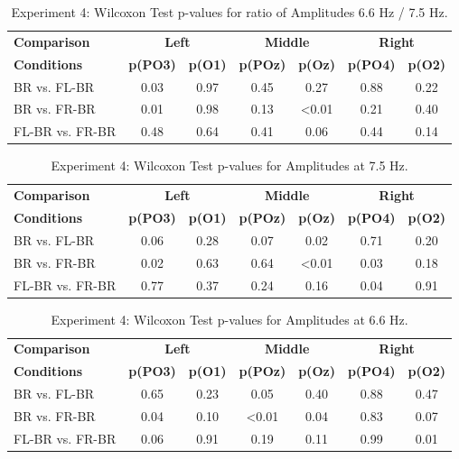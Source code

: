 \begin{table}[b]
\centering
\begin{tabularx}{\linewidth}{l *{6}{c}}
    \toprule
    \textbf{Comparison} & \multicolumn{2}{c}{\textbf{Left}} & \multicolumn{2}{c}{\textbf{Middle}} & \multicolumn{2}{c}{\textbf{Right}} \\
     \textbf{Conditions}& \textbf{p(PO3)} & \textbf{p(O1)} & \textbf{p(POz)} & \textbf{p(Oz)} & \textbf{p(PO4)} & \textbf{p(O2)} \\
    \midrule
    BR vs. FL-BR & 0.03 & 0.97 & 0.45 & 0.27 & 0.88 & 0.22 \\
    BR vs. FR-BR & 0.01 & 0.98 & 0.13 & <0.01 & 0.21 & 0.40 \\
    FL-BR vs. FR-BR & 0.48 & 0.64 & 0.41 & 0.06 & 0.44 & 0.14 \\
    \bottomrule
\end{tabularx}
\caption{Experiment 4: Wilcoxon Test p-values for ratio of Amplitudes 6.6 Hz / 7.5 Hz.}
\label{tab:ex4-p66/75}
\end{table}


\begin{table}[t]
\centering
\begin{tabularx}{\linewidth}{l *{6}{c}}
    \toprule
    \textbf{Comparison} & \multicolumn{2}{c}{\textbf{Left}} & \multicolumn{2}{c}{\textbf{Middle}} & \multicolumn{2}{c}{\textbf{Right}} \\
    \textbf{Conditions} & \textbf{p(PO3)} & \textbf{p(O1)} & \textbf{p(POz)} & \textbf{p(Oz)} & \textbf{p(PO4)} & \textbf{p(O2)} \\
    \midrule
    BR vs. FL-BR & 0.06 & 0.28 & 0.07 & 0.02 & 0.71 & 0.20 \\
    BR vs. FR-BR & 0.02 & 0.63 & 0.64 & <0.01 & 0.03 & 0.18 \\
    FL-BR vs. FR-BR & 0.77 & 0.37 & 0.24 & 0.16 & 0.04 & 0.91 \\
    \bottomrule
\end{tabularx}
\caption{Experiment 4: Wilcoxon Test p-values for Amplitudes at 7.5 Hz.}
\label{tab:ex4-p75}
\end{table}


\begin{table}[t]
\centering
\begin{tabularx}{\linewidth}{l *{6}{c}}
    \toprule
    \textbf{Comparison } & \multicolumn{2}{c}{\textbf{Left}} & \multicolumn{2}{c}{\textbf{Middle}} & \multicolumn{2}{c}{\textbf{Right}} \\
    \textbf{Conditions}& \textbf{p(PO3)} & \textbf{p(O1)} & \textbf{p(POz)} & \textbf{p(Oz)} & \textbf{p(PO4)} & \textbf{p(O2)} \\
    \midrule
    BR vs. FL-BR & 0.65 & 0.23 & 0.05 & 0.40 & 0.88 & 0.47 \\
    BR vs. FR-BR & 0.04 & 0.10 & <0.01 & 0.04 & 0.83 & 0.07 \\
    FL-BR vs. FR-BR & 0.06 & 0.91 & 0.19 & 0.11 & 0.99 & 0.01 \\
    \bottomrule
\end{tabularx}
\caption{Experiment 4: Wilcoxon Test p-values for Amplitudes at 6.6 Hz.}
\label{tab:ex4-p66}
\end{table}
